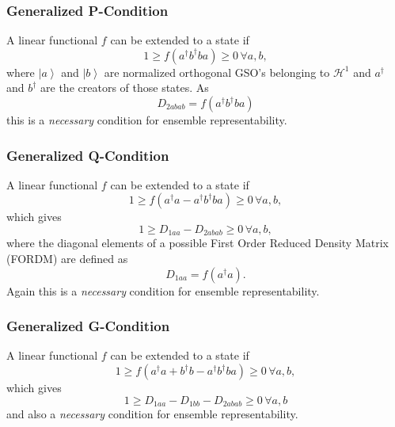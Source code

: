 \documentclass[aps,preprint]{revtex4}%
\begin{document}
\subsubsection{Generalized P-Condition}

A linear functional $f$ can be extended to a state if
\begin{equation}
1\geq f\left(  a^{\dagger}b^{\dagger}ba\right)  \geq0\,\forall a,b,
\end{equation}
where $\left\vert a\right\rangle $ and $\left\vert b\right\rangle $ are
normalized orthogonal GSO's belonging to $\mathcal{H}^{1}$ and $a^{\dagger}$
and $b^{\dagger}$ are the creators of those states. As
\begin{equation}
D_{2abab}=f\left(  a^{\dagger}b^{\dagger}ba\right)
\end{equation}
this is a \emph{necessary }condition for ensemble representability.

\subsubsection{Generalized Q-Condition}

A linear functional $f$ can be extended to a state if
\begin{equation}
1\geq f\left(  a^{\dagger}a-a^{\dagger}b^{\dagger}ba\right)  \geq0\,\forall
a,b,
\end{equation}
which gives
\begin{equation}
1\geq D_{1aa}-D_{2abab}\geq0\,\forall a,b,\label{Q1}%
\end{equation}
where the diagonal elements of a possible First Order Reduced Density Matrix
(FORDM) are defined as
\begin{equation}
D_{1aa}=f\left(  a^{\dagger}a\right)  .
\end{equation}
Again this is a \emph{necessary }condition for ensemble representability.

\subsubsection{Generalized G-Condition}

A linear functional $f$ can be extended to a state if
\begin{equation}
1\geq f\left(  a^{\dagger}a+b^{\dagger}b-a^{\dagger}b^{\dagger}ba\right)
\geq0\,\forall a,b,
\end{equation}
which gives
\begin{equation}
1\geq D_{1aa}-D_{1bb}-D_{2abab}\geq0\,\forall a,b\label{G1}%
\end{equation}
and also a \emph{necessary }condition for ensemble representability.
\end{document}
